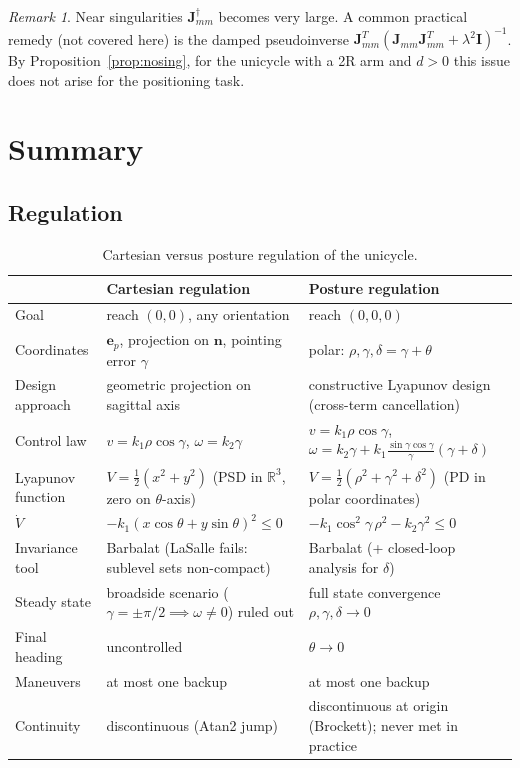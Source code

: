 \documentclass[11pt,a4paper]{article}
\newcommand{\Jmm}{\bm{J}_{mm}}
\newcommand{\R}{\mathbb{R}}
\theoremstyle{plain}
\theoremstyle{definition}
\theoremstyle{remark}
\newtheorem{remark}[theorem]{Remark}
\begin{document}
\begin{remark}
Near singularities $\Jmm^\dagger$ becomes very large. A common practical remedy (not covered here) is the damped pseudoinverse $\Jmm^T(\Jmm\Jmm^T+\lambda^2\bm I)^{-1}$. By Proposition~\ref{prop:nosing}, for the unicycle with a 2R arm and $d>0$ this issue does not arise for the positioning task.
\end{remark}

\section{Summary}

\subsection*{Regulation}

\begin{table}[ht]
\centering
\renewcommand{\arraystretch}{1.35}
\begin{tabular}{@{}>{\raggedright\arraybackslash}p{2.6cm}>{\raggedright\arraybackslash}p{6.0cm}>{\raggedright\arraybackslash}p{6.2cm}@{}}
\toprule
 & \textbf{Cartesian regulation} & \textbf{Posture regulation}\\
\midrule
Goal & reach $(0,0)$, any orientation & reach $(0,0,0)$\\
Coordinates & $\bm e_p$, projection on $\bm n$, pointing error $\gamma$ & polar: $\rho,\gamma,\delta=\gamma+\theta$\\
Design approach & geometric projection on sagittal axis & constructive Lyapunov design (cross-term cancellation)\\
Control law & $v=k_1\rho\cos\gamma$, $\omega=k_2\gamma$ & $v=k_1\rho\cos\gamma$, $\omega=k_2\gamma+k_1\frac{\sin\gamma\cos\gamma}{\gamma}(\gamma+\delta)$\\
Lyapunov function & $V=\frac12(x^2+y^2)$ (PSD in $\R^3$, zero on $\theta$-axis) & $V=\frac12(\rho^2+\gamma^2+\delta^2)$ (PD in polar coordinates)\\
$\dot V$ & $-k_1(x\cos\theta+y\sin\theta)^2\le0$ & $-k_1\cos^2\!\gamma\,\rho^2-k_2\gamma^2\le0$\\
Invariance tool & Barbalat (LaSalle fails: sublevel sets non-compact) & Barbalat (+ closed-loop analysis for $\delta$)\\
Steady state & broadside scenario ($\gamma=\pm\pi/2\implies\omega\ne0$) ruled out & full state convergence $\rho,\gamma,\delta\to0$\\
Final heading & uncontrolled & $\theta\to0$\\
Maneuvers & at most one backup & at most one backup\\
Continuity & discontinuous (Atan2 jump) & discontinuous at origin (Brockett); never met in practice\\
\bottomrule
\end{tabular}
\caption{Cartesian versus posture regulation of the unicycle.}
\end{table}
\end{document}
